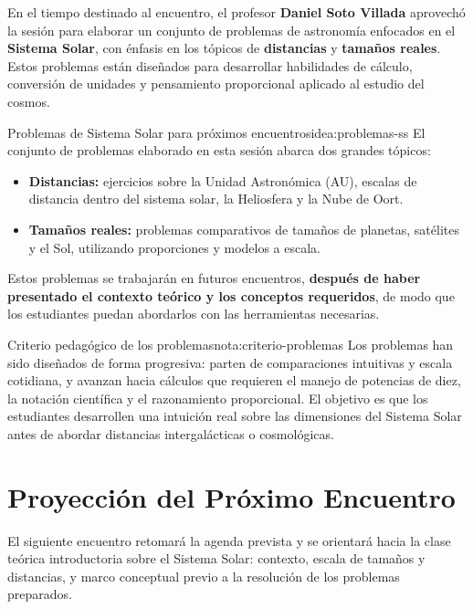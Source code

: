 En el tiempo destinado al encuentro, el profesor \textbf{Daniel Soto Villada} aprovechó
la sesión para elaborar un conjunto de problemas de astronomía enfocados en el
\textbf{Sistema Solar}, con énfasis en los tópicos de \textbf{distancias} y
\textbf{tamaños reales}. Estos problemas están diseñados para desarrollar habilidades
de cálculo, conversión de unidades y pensamiento proporcional aplicado al estudio del
cosmos.

\begin{idea}{Problemas de Sistema Solar para próximos encuentros}{idea:problemas-ss}
    El conjunto de problemas elaborado en esta sesión abarca dos grandes tópicos:
    \begin{itemize}[leftmargin=1.5em]
        \item \textbf{Distancias:} ejercicios sobre la Unidad Astronómica (AU),
              escalas de distancia dentro del sistema solar, la Heliosfera y la
              Nube de Oort.
        \item \textbf{Tamaños reales:} problemas comparativos de tamaños de
              planetas, satélites y el Sol, utilizando proporciones y modelos a escala.
    \end{itemize}
    Estos problemas se trabajarán en futuros encuentros, \textbf{después de haber
    presentado el contexto teórico y los conceptos requeridos}, de modo que los
    estudiantes puedan abordarlos con las herramientas necesarias.
\end{idea}

\begin{nota}{Criterio pedagógico de los problemas}{nota:criterio-problemas}
    Los problemas han sido diseñados de forma progresiva: parten de comparaciones
    intuitivas y escala cotidiana, y avanzan hacia cálculos que requieren el manejo
    de potencias de diez, la notación científica y el razonamiento proporcional.
    El objetivo es que los estudiantes desarrollen una intuición real sobre las
    dimensiones del Sistema Solar antes de abordar distancias intergalácticas o
    cosmológicas.
\end{nota}

\section{Proyección del Próximo Encuentro}

El siguiente encuentro retomará la agenda prevista y se orientará hacia la clase
teórica introductoria sobre el Sistema Solar: contexto, escala de tamaños y
distancias, y marco conceptual previo a la resolución de los problemas preparados.

